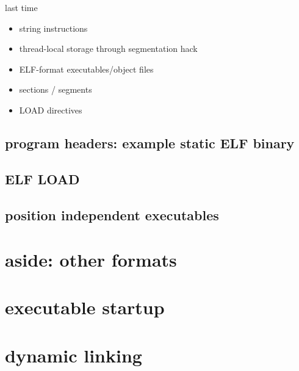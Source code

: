 \date{}
\title{}
\date{}



\begin{frame}
    \titlepage
\end{frame}

\begin{frame}{last time}
    \begin{itemize}
    \item string instructions
    \item thread-local storage through segmentation hack
    \item ELF-format executables/object files
    \item sections / segments
    \item LOAD directives
    \end{itemize}
\end{frame}



\subsection{program headers: example static ELF binary}



\subsection{ELF LOAD}


\subsection{position independent executables}



\section{aside: other formats}



\section{executable startup} %



\section{dynamic linking}

